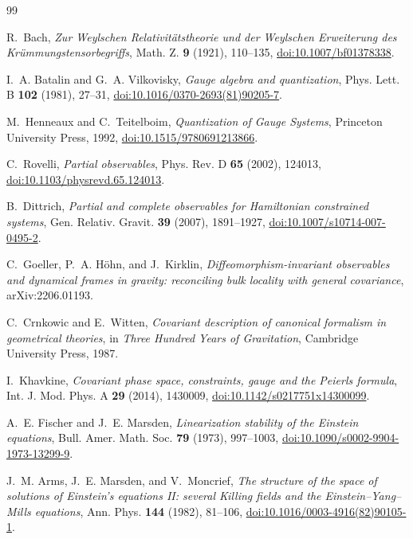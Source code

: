 \documentclass[11pt]{article}
\theoremstyle{definition}
\theoremstyle{remark}
\begin{document}
\begin{thebibliography}{99}
\sloppy
\raggedright

R.~Bach,
\emph{Zur Weylschen Relativit\"atstheorie und der Weylschen Erweiterung des
Kr\"ummungstensorbegriffs},
Math. Z. \textbf{9} (1921), 110--135,
\href{https://doi.org/10.1007/bf01378338}{doi:10.1007/bf01378338}.

I.~A. Batalin and G.~A. Vilkovisky,
\emph{Gauge algebra and quantization},
Phys. Lett. B \textbf{102} (1981), 27--31,
\href{https://doi.org/10.1016/0370-2693(81)90205-7}{doi:10.1016/0370-2693(81)90205-7}.

M.~Henneaux and C.~Teitelboim,
\emph{Quantization of Gauge Systems},
Princeton University Press, 1992,
\href{https://doi.org/10.1515/9780691213866}{doi:10.1515/9780691213866}.

C.~Rovelli,
\emph{Partial observables},
Phys. Rev. D \textbf{65} (2002), 124013,
\href{https://doi.org/10.1103/physrevd.65.124013}{doi:10.1103/physrevd.65.124013}.

B.~Dittrich,
\emph{Partial and complete observables for Hamiltonian constrained systems},
Gen. Relativ. Gravit. \textbf{39} (2007), 1891--1927,
\href{https://doi.org/10.1007/s10714-007-0495-2}{doi:10.1007/s10714-007-0495-2}.

C.~Goeller, P.~A. H\"ohn, and J.~Kirklin,
\emph{Diffeomorphism-invariant observables and dynamical frames in gravity:
reconciling bulk locality with general covariance},
arXiv:2206.01193.

C.~Crnkowic and E.~Witten,
\emph{Covariant description of canonical formalism in geometrical theories},
in \emph{Three Hundred Years of Gravitation}, Cambridge University Press,
1987.

I.~Khavkine,
\emph{Covariant phase space, constraints, gauge and the Peierls formula},
Int. J. Mod. Phys. A \textbf{29} (2014), 1430009,
\href{https://doi.org/10.1142/s0217751x14300099}{doi:10.1142/s0217751x14300099}.

A.~E. Fischer and J.~E. Marsden,
\emph{Linearization stability of the Einstein equations},
Bull. Amer. Math. Soc. \textbf{79} (1973), 997--1003,
\href{https://doi.org/10.1090/s0002-9904-1973-13299-9}{doi:10.1090/s0002-9904-1973-13299-9}.

J.~M. Arms, J.~E. Marsden, and V.~Moncrief,
\emph{The structure of the space of solutions of Einstein's equations II:
several Killing fields and the Einstein--Yang--Mills equations},
Ann. Phys. \textbf{144} (1982), 81--106,
\href{https://doi.org/10.1016/0003-4916(82)90105-1}{doi:10.1016/0003-4916(82)90105-1}.


\end{thebibliography}
\end{document}
